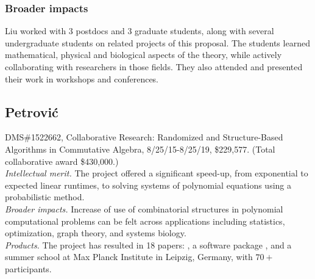 \documentclass[11pt]{NSFamsart}
\begin{document}

\subsubsection*{Broader impacts}  Liu worked with
3 postdocs and 3 graduate students, along with several undergraduate students 
on related projects of this proposal. 
The students learned mathematical, physical and biological
aspects of the theory, while actively collaborating  with researchers in those fields.
They also attended and presented their work in workshops and conferences.


\subsection*{Petrovi\'c} 
DMS\#1522662, Collaborative Research: Randomized and Structure-Based Algorithms in Commutative Algebra, 8/25/15-8/25/19, \$229,577. (Total collaborative award \$430,000.)
\\
\emph{Intellectual merit.} The project offered  a  significant speed-up, from exponential  to expected linear runtimes, to   solving systems of polynomial equations %
using a probabilistic method.  
 \\
\emph{Broader impacts.} Increase of use of combinatorial structures in polynomial computational problems can be felt across applications including statistics, optimization, graph theory, and systems biology. 
\\
\emph{Products.}
 The project has resulted in 18 papers: \cite{GKP-fienberg, RMI, semigroups, AlgStatNtwk-ARSIA, WhatIsMB, jalgstat-fienberg-editorial, karwa2016dergms, hypergraphs-toric, jesus1, jesus2, jesus3, jesus4, jesus5, jesus6, jesus7, algebraicViolators, bouquets, surveyAlgStatCONMchp},   
 a software package \cite{RMIm2}, 
and a  summer school at Max Planck Institute in Leipzig, Germany,  with $70+$ participants. 
\end{document}
